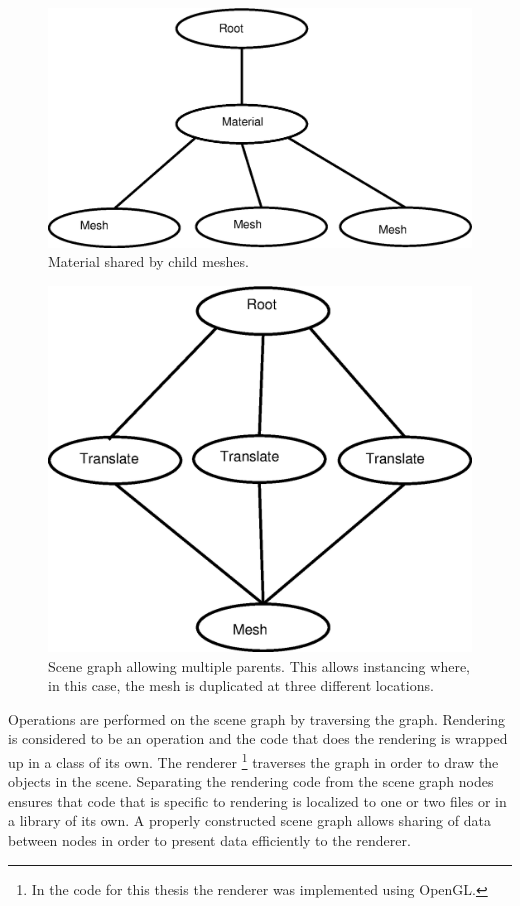 \begin{figure}
    \centering
    \includegraphics[height=0.3\textheight]{MaterialNode}
    \caption{\label{Fig:MaterialNode}Material shared by child meshes.}
\end{figure}

\begin{figure}
    \centering
    \includegraphics[height=0.4\textheight]{SceneGraphMultipleParents}
    \caption{\label{Fig:SceneGraphMultipleParents}Scene graph allowing multiple parents.
    This allows instancing where, in this case, the mesh is duplicated at three
    different locations.}
\end{figure}

Operations are performed on the scene graph by traversing the graph. Rendering
is considered to be an operation and the code that does the rendering is wrapped
up in a class of its own. The renderer \footnote{In the code for this thesis
the renderer was implemented using OpenGL.} traverses the
graph in order to draw the objects in the scene. Separating the rendering code
from the scene graph nodes ensures that code that is specific to rendering is
localized to one or two files or in a library of its own. A properly constructed scene graph
allows sharing of data between nodes in order to present data efficiently to the
renderer. 

